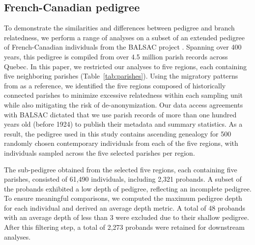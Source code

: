 

\subsection{French-Canadian pedigree}

To demonstrate the similarities and differences between pedigree and branch relatedness,
we perform a range of analyses on a subset of an extended pedigree of
French-Canadian individuals from the BALSAC project \citep{vezina2020overview}.
%
Spanning over 400 years, this pedigree is compiled from over 4.5 million parish records across Quebec.
%
In this paper, we restricted our analyses to five regions,
each containing five neighboring parishes (Table~\ref{tab:parishes}).
%
Using the migratory patterns from \citet{andersontrocme2023genes} as a reference,
we identified the five regions composed of historically connected parishes to minimize excessive relatedness
within each sampling unit while also mitigating the risk of de-anonymization.
%
Our data access agreements with BALSAC dictated that we use parish records of more than one hundred years old
(before 1924) to publish their metadata and summary statistics.
%
As a result, the pedigree used in this study contains ascending genealogy for
500 randomly chosen contemporary individuals from each of the five regions,
with individuals sampled across the five selected parishes per region.

The sub-pedigree obtained from the selected five regions, each containing five parishes,
consisted of 61,490 individuals, including 2,321 probands.
%
A subset of the probands exhibited a low depth of pedigree,
reflecting an incomplete pedigree.
%
To ensure meaningful comparisons, we computed the maximum pedigree depth
for each individual and derived an average depth metric.
%
A total of 48 probands with an average depth of less than 3 were excluded
due to their shallow pedigree.
%
After this filtering step, a total of 2,273 probands were retained for downstream analyses.

